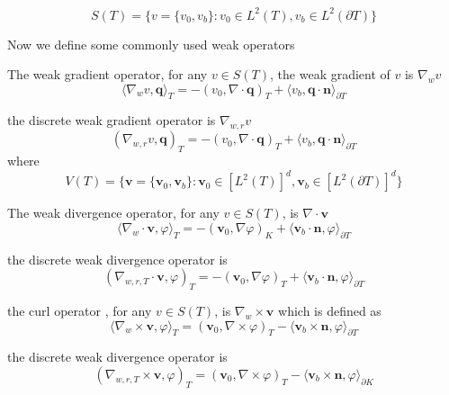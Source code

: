 \begin{equation}
S(T) = \{ v = \{v_{0}, v_{b}\} : v_{0} \in L^{2}(T), v_{b} \in L^{2} (\partial T) \}
\end{equation}

Now we define some commonly used weak operators

The weak gradient operator, for any $ v \in S(T) $, the weak gradient of $ v $ is $ \nabla_{w} v $
\begin{equation}
\langle \nabla_{w} v, \mathbf{q} \rangle_{T} = -(v_{0}, \nabla \cdot \mathbf{q})_{T} + \langle v_{b}, \mathbf{q} \cdot \mathbf{n} \rangle_{\partial T}
\end{equation}

the discrete weak gradient operator is $ \nabla_{w, r} v $
\begin{equation}
(\nabla_{w,r} v, \mathbf{q})_{T} = -(v_{0}, \nabla \cdot \mathbf{q})_{T} + \langle v_{b}, \mathbf{q} \cdot \mathbf{n} \rangle_{\partial T}
\end{equation}
where
\begin{equation}
V(T) = \{ \mathbf{v} = \{  \mathbf{v}_{0}, \mathbf{v}_{b} \} : \mathbf{v}_{0} \in [L^{2} (T)]^{d}, \mathbf{v}_{b} \in [L^{2} (\partial T)]^{d} \}
\end{equation}

The weak divergence operator, for any $ v \in S(T) $, is $ \nabla \cdot \mathbf{v} $
\begin{equation}
\langle \nabla_{w} \cdot \mathbf{v}, \varphi \rangle_{T} = -(\mathbf{v}_{0}, \nabla \varphi)_{K} + \langle \mathbf{v}_{b} \cdot \mathbf{n}, \varphi \rangle_{\partial T}
\end{equation}

the discrete weak divergence operator is 
\begin{equation}
(\nabla_{w, r, T} \cdot \mathbf{v}, \varphi)_{T} = -(\mathbf{v}_{0}, \nabla \varphi)_{T} + \langle \mathbf{v}_{b} \cdot \mathbf{n}, \varphi \rangle_{\partial T}
\end{equation}

the curl operator , for any $ v \in S(T) $, is $ \nabla_{w} \times \mathbf{v}$ which is defined as 
\begin{equation}
\langle \nabla_{w} \times \mathbf{v}, \varphi \rangle_{T} = (\mathbf{v}_{0}, \nabla \times \varphi)_{T} - \langle \mathbf{v}_{b} \times \mathbf{n}, \varphi \rangle_{\partial T}
\end{equation}

the discrete weak divergence operator is 
\begin{equation}
(\nabla_{w, r, T} \times \mathbf{v}, \varphi)_{T} = (\mathbf{v}_{0}, \nabla \times \varphi)_{T} - \langle \mathbf{v}_{b} \times \mathbf{n}, \varphi \rangle_{\partial K}
\end{equation}

